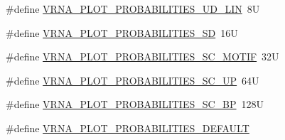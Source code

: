 \begin{DoxyCompactItemize}
\#define \mbox{\hyperlink{group__plotting__utils_ga6cce76e1c319a60a8b8e39d8887e2f1a}{V\+R\+N\+A\+\_\+\+P\+L\+O\+T\+\_\+\+P\+R\+O\+B\+A\+B\+I\+L\+I\+T\+I\+E\+S\+\_\+\+U\+D\+\_\+\+L\+IN}}~8U
\item 
\#define \mbox{\hyperlink{group__plotting__utils_ga78f8da179bc3f52b1c1180931ed8b0f7}{V\+R\+N\+A\+\_\+\+P\+L\+O\+T\+\_\+\+P\+R\+O\+B\+A\+B\+I\+L\+I\+T\+I\+E\+S\+\_\+\+SD}}~16U
\item 
\#define \mbox{\hyperlink{group__plotting__utils_ga228fe1c75b71cb40726b9423d2bed2a9}{V\+R\+N\+A\+\_\+\+P\+L\+O\+T\+\_\+\+P\+R\+O\+B\+A\+B\+I\+L\+I\+T\+I\+E\+S\+\_\+\+S\+C\+\_\+\+M\+O\+T\+IF}}~32U
\item 
\#define \mbox{\hyperlink{group__plotting__utils_ga41a92625e75a77555b3f6e3a0ef7b89b}{V\+R\+N\+A\+\_\+\+P\+L\+O\+T\+\_\+\+P\+R\+O\+B\+A\+B\+I\+L\+I\+T\+I\+E\+S\+\_\+\+S\+C\+\_\+\+UP}}~64U
\item 
\#define \mbox{\hyperlink{group__plotting__utils_ga886fa0619733b98667111faa56cd03d6}{V\+R\+N\+A\+\_\+\+P\+L\+O\+T\+\_\+\+P\+R\+O\+B\+A\+B\+I\+L\+I\+T\+I\+E\+S\+\_\+\+S\+C\+\_\+\+BP}}~128U
\item 
\#define \mbox{\hyperlink{group__plotting__utils_gaa3a3d5cf87de5120a93eab3be788b6fb}{V\+R\+N\+A\+\_\+\+P\+L\+O\+T\+\_\+\+P\+R\+O\+B\+A\+B\+I\+L\+I\+T\+I\+E\+S\+\_\+\+D\+E\+F\+A\+U\+LT}}
\end{DoxyCompactItemize}
